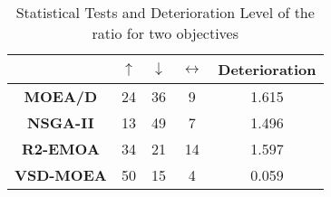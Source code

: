 
\begin{table}[t]
\centering
\caption{Statistical Tests and Deterioration Level of the \HV{} ratio for two objectives}
\label{tab:Tests_HV_2obj}

\begin{scriptsize}
\begin{tabular}{c c|c|c|c}
\cline{2-5}
                                        & \textbf{$\uparrow$} & \textbf{$\downarrow$} & \textbf{$\leftrightarrow$} & \textbf{Deterioration} \\ \hline
\multicolumn{1}{c|}{\textbf{MOEA/D}}   & 24                  & 36                    & 9                          & 1.615         \\ \hline
\multicolumn{1}{c|}{\textbf{NSGA-II}}  & 13                  & 49                    & 7                          & 1.496         \\ \hline
\multicolumn{1}{c|}{\textbf{R2-EMOA}}  & 34                  & 21                    & 14                         & 1.597         \\ \hline
\multicolumn{1}{c|}{\textbf{VSD-MOEA}} & 50                  & 15                    & 4                          & 0.059         \\ \hline
\end{tabular}%
\end{scriptsize}
\end{table}


%

